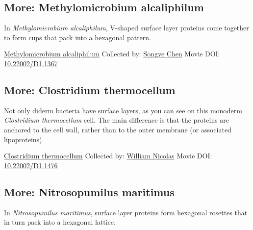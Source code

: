 \documentclass[]{tufte-book}
\begin{document}
\hypertarget{Methylomicrobium_alcaliphilum}{%
\subsection*{More: Methylomicrobium alcaliphilum}\label{Methylomicrobium_alcaliphilum}}

In \emph{Methylomicrobium alcaliphilum}, V-shaped surface layer proteins come together to form cups that pack into a hexagonal pattern.



\hypertarget{htmlwidget-df370f641668124327ed}{}

\label{fig:2-7a}\protect\hyperlink{tree}{Methylomicrobium alcaliphilum} Collected by: \protect\hyperlink{songye_chen}{Songye Chen} Movie DOI: \href{https://doi.org/10.22002/D1.1367}{10.22002/D1.1367}

\hypertarget{Clostridium_thermocellum}{%
\subsection*{More: Clostridium thermocellum}\label{Clostridium_thermocellum}}

Not only diderm bacteria have surface layers, as you can see on this monoderm \emph{Clostridium thermocellum} cell. The main difference is that the proteins are anchored to the cell wall, rather than to the outer membrane (or associated lipoproteins).



\hypertarget{htmlwidget-941c4199e8fcd28a36e2}{}

\label{fig:2-7b}\protect\hyperlink{tree}{Clostridium thermocellum} Collected by: \protect\hyperlink{william_nicolas}{William Nicolas} Movie DOI: \href{https://doi.org/10.22002/D1.1476}{10.22002/D1.1476}

\hypertarget{Nitrosopumilus_maritimus}{%
\subsection*{More: Nitrosopumilus maritimus}\label{Nitrosopumilus_maritimus}}

In \emph{Nitrosopumilus maritimus}, surface layer proteins form hexagonal rosettes that in turn pack into a hexagonal lattice.
\end{document}
